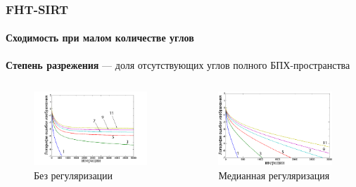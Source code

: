 \begin{frame}
\frametitle{FHT-SIRT}
\framesubtitle{Сходимость при малом количестве углов}
\textbf{Степень разрежения} --- доля отсутствующих углов полного БПХ-пространства
\begin{columns}[T,onlytextwidth]
  \hspace*{-1cm}
  \begin{column}{0.6\textwidth}
  \begin{figure}
    \includegraphics[width=\textwidth]{../Dissertation/images/part1_img/raw}
    \caption{Без регуляризации}
  \end{figure}
  
  \end{column}
  \begin{column}{0.55\textwidth}
    \begin{figure}
    \includegraphics[width=\textwidth]{../Dissertation/images/part1_img/medk}
    \caption{Медианная регуляризация}
    \end{figure}
  \end{column}
\end{columns}
\end{frame}

